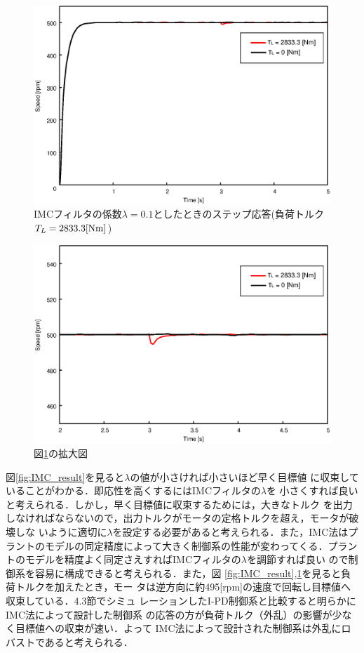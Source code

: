 \documentclass[a4paper,12pt]{jarticle}
\begin{document}
%
%
\begin{figure}[tbp]
 \begin{center}
  \includegraphics[width = 150mm]{fig/IMC_TL.eps}
 \end{center}
 \caption{IMCフィルタの係数$\lambda=0.1$としたときのステップ応答(負荷トルク$T_L=2833.3[\rm{Nm}]$)}
 \label{fig:IMC_TL}
\end{figure}
%
%
\begin{figure}[tbp]
 \begin{center}
  \includegraphics[width = 150mm]{fig/IMC_TLb.eps}
 \end{center}
 \caption{図\ref{fig:IMC_TL}の拡大図}
 \label{fig:IMC_TLb}
\end{figure}
%
図\ref{fig:IMC_result}を見ると$\lambda$の値が小さければ小さいほど早く目標値
に収束していることがわかる．即応性を高くするにはIMCフィルタの$\lambda$を
小さくすれば良いと考えられる．しかし，早く目標値に収束するためには，大きなトルク
を出力しなければならないので，出力トルクがモータの定格トルクを超え，モータが破壊しな
いように適切に$\lambda$を設定する必要があると考えられる．また，IMC法はプ
ラントのモデルの同定精度によって大きく制御系の性能が変わってくる．プラン
トのモデルを精度よく同定さえすればIMCフィルタの$\lambda$を調節すれば良い
ので制御系を容易に構成できると考えられる．また，図
\ref{fig:IMC_result},\ref{fig:IMC_TL}を見ると負荷トルクを加えたとき，モー
タは逆方向に約495[rpm]の速度で回転し目標値へ収束している．4.3節でシミュ
レーションしたI-PD制御系と比較すると明らかにIMC法によって設計した制御系
の応答の方が負荷トルク（外乱）の影響が少なく目標値への収束が速い．よって
IMC法によって設計された制御系は外乱にロバストであると考えられる．
%
\newpage
%
\end{document}
